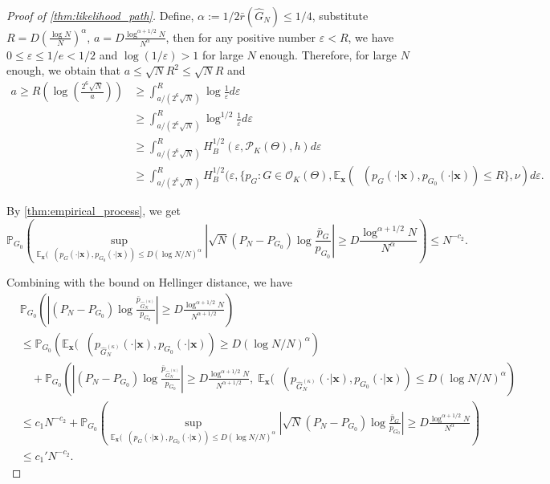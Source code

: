 \documentclass[twoside]{article}
\DeclareMathOperator*{\hels}{D_{h}^2}
\theoremstyle{plain}
\theoremstyle{definition}
\theoremstyle{plain}
\def\rvx{{\mathbf{x}}}
\def\vx{{\bm{x}}}
\newcommand{\bbE}{\mathbb{E}}
\begin{document}
\begin{proof}[Proof of \cref{thm:likelihood_path}]
    Define, $\alpha := 1/2\bar{r}(\widehat{G}_N) \leq 1/4$, substitute $R = D \left( \frac{\log N}{N} \right)^{\alpha}$, $a = D \frac{\log^{\alpha + 1/2} N}{N^{\alpha}}$, then for any positive number $\varepsilon < R$, we have $0 \leq \varepsilon \leq 1/e < 1/2$ and $\log(1/\varepsilon) > 1$ for large $N$ enough. Therefore, for large $N$ enough, we obtain that $a \leq \sqrt{N} R^2 \leq \sqrt{N} R$ and 
    \begin{align*}
        a \geq R \left( \log \left( \frac{2^6 \sqrt{N}}{a} \right) \right) &\geq \int_{a/(2^6 \sqrt{N})}^R \log \frac{1}{\varepsilon} d \varepsilon \\
        &\geq \int_{a/(2^6 \sqrt{N})}^R \log^{1/2} \frac{1}{\varepsilon} d \varepsilon \\
        &\geq \int_{a/(2^6 \sqrt{N})}^R H^{1/2}_B (\varepsilon, \mathcal{P}_K (\Theta), h) d \varepsilon \\
        &\geq \int_{a/(2^6 \sqrt{N})}^R H^{1/2}_B (\varepsilon, \{ p_G : G \in \mathcal{O}_{K} (\Theta), \bbE_{\rvx}(\hels(p_G(\cdot | \vx), p_{G_0}(\cdot | \vx)) \leq R \}, \nu) d \varepsilon.
    \end{align*}

    By \cref{thm:empirical_process}, we get $$\mathbb{P}_{G_0} \left( \sup_{\bbE_{\rvx}(\hels(p_G(\cdot | \vx), p_{G_0}(\cdot | \vx)) \leq D(\log N/N)^{\alpha}} \left| \sqrt{N} (P_N - P_{G_0}) \log \frac{\bar{p}_G}{p_{G_0}} \right| \geq D \frac{\log^{\alpha + 1/2} N}{N^{\alpha}} \right) \leq N^{-c_2}.$$

    Combining with the bound on Hellinger distance, we have 
    \begin{align*}
&\mathbb{P}_{G_0}\!\left(\left|(P_N - P_{G_0}) \log \frac{\bar{p}_{\widehat{G}_N^{(\kappa)}}}{p_{G_0}}\right|
   \geq D \frac{\log^{\alpha + 1/2} N}{N^{\alpha + 1/2}}\right) \\
&\leq \mathbb{P}_{G_0}\!\left( \bbE_{\rvx}(\hels(p_{\widehat{G}_N^{(\kappa)}}(\cdot | \vx), p_{G_0}(\cdot | \vx)) \geq D(\log N/N)^{\alpha} \right) \\
&\quad + \mathbb{P}_{G_0}\!\left(\left|(P_N - P_{G_0}) \log \frac{\bar{p}_{\widehat{G}_N^{(\kappa)}}}{p_{G_0}}\right|
   \geq D \frac{\log^{\alpha + 1/2} N}{N^{\alpha + 1/2}},\;
   \bbE_{\rvx}(\hels(p_{\widehat{G}_N^{(\kappa)}}(\cdot | \vx), p_{G_0}(\cdot | \vx)) \leq D(\log N/N)^{\alpha} \right) \\
& \leq c_1 N^{-c_2} 
   + \mathbb{P}_{G_0}\!\left(\sup_{\bbE_{\rvx}(\hels(p_G(\cdot | \vx), p_{G_0}(\cdot | \vx)) \leq D(\log N/N)^{\alpha}} 
   \left|\sqrt{N}(P_N - P_{G_0}) \log \frac{\bar{p}_G}{p_{G_0}}\right|
   \geq D \frac{\log^{\alpha + 1/2} N}{N^{\alpha}}\right) \\
& \leq c_1' N^{-c_2}.
\end{align*}


\end{proof}
\end{document}
